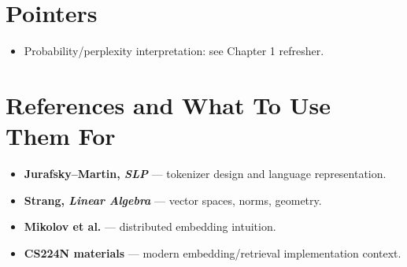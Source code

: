 \section*{Pointers}
\begin{itemize}[leftmargin=1.5em]
  \item Probability/perplexity interpretation: see Chapter 1 refresher.
\end{itemize}

\section*{References and What To Use Them For}
\begin{itemize}[leftmargin=1.5em]
  \item \textbf{Jurafsky--Martin, \emph{SLP}} --- tokenizer design and language representation.
  \item \textbf{Strang, \emph{Linear Algebra}} --- vector spaces, norms, geometry.
  \item \textbf{Mikolov et al.} --- distributed embedding intuition.
  \item \textbf{CS224N materials} --- modern embedding/retrieval implementation context.
\end{itemize}
